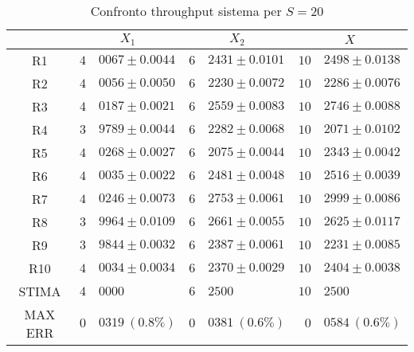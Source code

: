 \begin{table}[!h]
\begin{tabular}{c|r@{.}l|r@{.}l|r@{.}l}
& \multicolumn{2}{|c|}{$X_1$}
& \multicolumn{2}{|c|}{$X_2$}
& \multicolumn{2}{|c}{$X$} 
\\          
\hline
R1      & $4$&$0067 \pm 0.0044$ & $6$&$2431 \pm 0.0101$ & $10$&$2498 \pm 0.0138$ \\
R2      & $4$&$0056 \pm 0.0050$ & $6$&$2230 \pm 0.0072$ & $10$&$2286 \pm 0.0076$ \\
R3      & $4$&$0187 \pm 0.0021$ & $6$&$2559 \pm 0.0083$ & $10$&$2746 \pm 0.0088$ \\
R4      & $3$&$9789 \pm 0.0044$ & $6$&$2282 \pm 0.0068$ & $10$&$2071 \pm 0.0102$ \\
R5      & $4$&$0268 \pm 0.0027$ & $6$&$2075 \pm 0.0044$ & $10$&$2343 \pm 0.0042$ \\
R6      & $4$&$0035 \pm 0.0022$ & $6$&$2481 \pm 0.0048$ & $10$&$2516 \pm 0.0039$ \\
R7      & $4$&$0246 \pm 0.0073$ & $6$&$2753 \pm 0.0061$ & $10$&$2999 \pm 0.0086$ \\
R8      & $3$&$9964 \pm 0.0109$ & $6$&$2661 \pm 0.0055$ & $10$&$2625 \pm 0.0117$ \\
R9      & $3$&$9844 \pm 0.0032$ & $6$&$2387 \pm 0.0061$ & $10$&$2231 \pm 0.0085$ \\
R10     & $4$&$0034 \pm 0.0034$ & $6$&$2370 \pm 0.0029$ & $10$&$2404 \pm 0.0038$ \\
STIMA   & $4$&$0000$            & $6$&$2500$            & $10$&$2500$            \\
MAX ERR & $0$&$0319 \ (0.8\%)$  & $0$&$0381 \ (0.6\%)$  & $0$&$0584 \ (0.6\%)$     
\end{tabular}
\centering
\caption{Confronto throughput sistema per $S=20$}
\label{tab:20_x}
\end{table}
